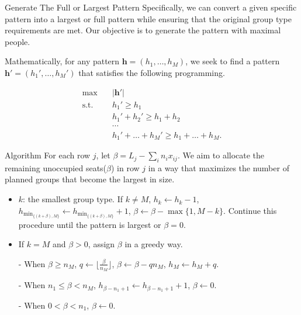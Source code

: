   \begin{frame}{Generate The Full or Largest Pattern}
    Specifically, we can convert a given specific pattern into a largest or full pattern while ensuring that the original group type requirements are met. Our objective is to generate the pattern with maximal people.

    Mathematically, for any pattern $\bm{h} = (h_1, \ldots, h_M)$, we seek to find a pattern $\bm{h}{'} = (h_1{'}, \ldots, h_M{'})$ that satisfies the following programming.

    \begin{equation*}\label{full_largest}
      \begin{aligned}
      \max \quad & |\bm{h}{'}| \\
      \text {s.t.} \quad & h_1{'} \geq h_1 \\
      &  h_1{'} + h_2{'} \geq h_1 + h_2 \\
      & \cdots \\
      & h_1{'} + \ldots + h_M{'} \geq h_1 + \ldots + h_M.
      \end{aligned}
    \end{equation*}
  \end{frame}

  \begin{frame}{Algorithm}
    For each row $j$, let $\beta = L_{j} - \sum_{i} n_{i} x_{ij}$. We aim to allocate the remaining unoccupied seats($\beta$) in row $j$ in a way that maximizes the number of planned groups that become the largest in size.
    \vspace{0.5cm}
    
    \begin{itemize}
      \item $k$: the smallest group type.
      If $k \neq M$, $h_{k} \gets h_{k} -1$, $h_{\min_{\{(k+\beta), M\}}} \gets h_{\min_{\{(k+\beta), M\}}} +1$, $\beta \gets \beta - \max\{1, M - k\}$. Continue this procedure until the pattern is largest or $\beta =0$.
      \item If $k = M$ and $\beta > 0$, assign $\beta$ in a greedy way.
      \item[-] When $\beta \geq n_{M}$, $q \gets \lfloor\frac{\beta}{n_M}\rfloor$, $\beta \gets \beta - q n_M$, $h_{M} \gets h_{M} + q$.
      \item[-] When $n_{1} \leq \beta < n_{M}$, $h_{\beta-n_1+1} \gets h_{\beta-n_1+1} + 1$, $\beta \gets 0$.
      \item[-] When $0 < \beta < n_{1}$, $\beta \gets 0$.
    \end{itemize}
  \end{frame}
